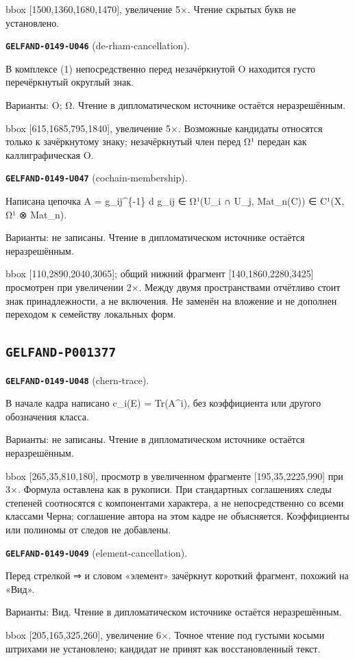 \documentclass[11pt]{article}
\theoremstyle{definition}
\theoremstyle{remark}
\begin{document}
bbox [1500,1360,1680,1470], увеличение 5×. Чтение скрытых букв не установлено.\par\medskip
\noindent\leavevmode{}\label{GELFAND-P001376:de-rham-cancellation:note}\textbf{\texttt{GELFAND-0149-U046}} (de-rham-cancellation).\par\nopagebreak[4]
В комплексе (1) непосредственно перед незачёркнутой O находится густо перечёркнутый округлый знак.\par
Варианты: O; Ω. Чтение в дипломатическом источнике остаётся неразрешённым.\par
bbox [615,1685,795,1840], увеличение 5×. Возможные кандидаты относятся только к зачёркнутому знаку; незачёркнутый член перед Ω¹ передан как каллиграфическая O.\par\medskip
\noindent\leavevmode{}\label{GELFAND-P001376:cochain-membership:note}\textbf{\texttt{GELFAND-0149-U047}} (cochain-membership).\par\nopagebreak[4]
Написана цепочка A = g\_ij\textasciicircum{}\{-1\} d g\_ij ∈ Ω¹(U\_i ∩ U\_j, Mat\_n(C)) ∈ C¹(X, Ω¹ ⊗ Mat\_n).\par
Варианты: не записаны. Чтение в дипломатическом источнике остаётся неразрешённым.\par
bbox [110,2890,2040,3065]; общий нижний фрагмент [140,1860,2280,3425] просмотрен при увеличении 2×. Между двумя пространствами отчётливо стоит знак принадлежности, а не включения. Не заменён на вложение и не дополнен переходом к семейству локальных форм.\par\medskip

\subsection*{\texttt{GELFAND-P001377}}
\noindent\leavevmode{}\label{GELFAND-P001377:chern-trace:note}\textbf{\texttt{GELFAND-0149-U048}} (chern-trace).\par\nopagebreak[4]
В начале кадра написано c\_i(E) = Tr(A\textasciicircum{}i), без коэффициента или другого обозначения класса.\par
Варианты: не записаны. Чтение в дипломатическом источнике остаётся неразрешённым.\par
bbox [265,35,810,180], просмотр в увеличенном фрагменте [195,35,2225,990] при 3×. Формула оставлена как в рукописи. При стандартных соглашениях следы степеней соотносятся с компонентами характера, а не непосредственно со всеми классами Черна; соглашение автора на этом кадре не объясняется. Коэффициенты или полиномы от следов не добавлены.\par\medskip
\noindent\leavevmode{}\label{GELFAND-P001377:element-cancellation:note}\textbf{\texttt{GELFAND-0149-U049}} (element-cancellation).\par\nopagebreak[4]
Перед стрелкой ⇒ и словом «элемент» зачёркнут короткий фрагмент, похожий на «Вид».\par
Варианты: Вид. Чтение в дипломатическом источнике остаётся неразрешённым.\par
bbox [205,165,325,260], увеличение 6×. Точное чтение под густыми косыми штрихами не установлено; кандидат не принят как восстановленный текст.\par\medskip
\end{document}
